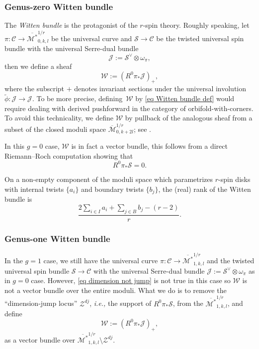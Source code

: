 \documentclass[11pt]{amsart}
\theoremstyle{definition}
\theoremstyle{remark}
\newcommand{\<}{\left<}
\renewcommand{\>}{\right>}
\numberwithin{equation}{section}
\def\Mbar{{\overline{\mathcal M}}}
\def\Mbarstar{{\overline{\mathcal M^*}}}
\begin{document}
\subsubsection{Genus-zero Witten bundle}
The \textit{Witten bundle} is the protagonist of the $r$-spin theory. Roughly speaking, let $\pi: \mathcal{C} \to \Mbarstar_{0,k,l}^{1/r}$ be the universal curve and $\mathcal{S} \to \mathcal{C}$ be the twisted universal spin bundle with the universal Serre-dual bundle 
\begin{equation}\label{eq universal serre dual bundle}
\mathcal{J}:= \mathcal{S}^{\vee} \otimes \omega_{\pi},
\end{equation}
then we define a sheaf
\begin{equation}
\label{eq Witten bundle def}
{\mathcal{W}}:= (R^0\pi_*\mathcal{J})_+,
\end{equation}
where the subscript $+$ denotes invariant sections under the universal involution $\widetilde{\phi}: \mathcal{J} \to \mathcal{J}.$ 
To be more precise, defining~${\mathcal{W}}$ by \eqref{eq Witten bundle def} would require dealing with derived pushforward in the category of orbifold-with-corners. To avoid this technicality, we define ${\mathcal{W}}$ by pullback of the analogous sheaf from a subset of the closed moduli space $\Mbar_{0,k+2l}^{1/r}$; see \cite[\S 4.1]{BCT1}. 

In this $g=0$ case, $\mathcal W$ is in fact a vector bundle, this follows from a direct Riemann--Roch computation showing that 
\begin{equation}\label{eq dimension not jump}
    R^0\pi_*\mathcal{S}=0.
\end{equation}




 On a non-empty component of the moduli space which parametrizes $r$-spin disks with internal twists $\{a_i\}$ and boundary twists $\{b_j\}$, the (real) rank of the Witten bundle is
\begin{equation}\label{eq rank of witten bundle}\frac{2 \sum_{i\in I} a_i + \sum_{j\in B} b_j - (r-2)}{r}.\end{equation}


\subsubsection{Genus-one Witten bundle}
In the $g=1$ case, we still have  the universal curve $\pi: \mathcal{C} \to \Mbarstar_{1,k,l}^{1/r}$ and the twisted universal spin bundle $\mathcal{S} \to \mathcal{C}$   with the universal Serre-dual bundle 
$\mathcal{J}:= \mathcal{S}^{\vee} \otimes \omega_{\pi}$
as in $g=0$ case. However,
\eqref{eq dimension not jump} is not true in this case so $\mathcal W$ is not a vector bundle over the entire moduli. What we do is to remove the ``dimension-jump locus'' $\mathcal Z^{dj}$, \textit{i.e.,} the support of $R^0\pi_*\mathcal S$,  from the $\Mbarstar_{1,k,l}^{1/r}$, and define 
\begin{equation*}
{\mathcal{W}}:= (R^0\pi_*\mathcal{J})_+,
\end{equation*}
as a vector bundle over $\Mbarstar_{1,k,l}^{1/r}\setminus \mathcal Z^{dj}$. 
\end{document}
